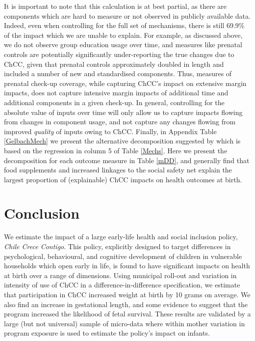 \documentclass[12pt]{article}
\begin{document}
\begin{spacing}{1.4}
It is important to note that this calculation is at best partial, as
there are components which are hard to measure or not observed in
publicly available data.  Indeed, even when controlling for the full
set of mechanisms, there is still 69.9\% of the impact which we are
unable to explain.  For example, as discussed above, we do not
observe group education usage over time, and measures like prenatal
controls are potentially significantly under-reporting the true changes
due to ChCC, given that prenatal controls approximately doubled in
length and included a number of new and standardised components.
Thus, measures of prenatal check-up coverage, while capturing ChCC's
impact on extensive margin impacts, does not capture intensive margin
impacts of additional time and additional components in a given check-up.
In general, controlling for the absolute value of inputs over time will
only allow us to capture impacts flowing from changes in component usage,
and not capture any changes flowing from improved \emph{quality} of
inputs owing to ChCC.
Finally, in Appendix Table \ref{GelbachMech} we present the alternative
decomposition suggested by \citet{Gelbach2016} which is based on the
regression in column 5 of Table \ref{Mechs}.  Here we present the
decomposition for each outcome measure in Table \ref{mDD}, and generally
find that food supplements and increased linkages to the social safety
net explain the largest proportion of (explainable) ChCC impacts on
health outcomes at birth.

\section{Conclusion}
We estimate the impact of a large early-life health and social inclusion
policy, \emph{Chile Crece Contigo}.  This policy, explicitly designed to
target differences in psychological, behavioural, and cognitive development
of children in vulnerable households which open early in life, is found to
have significant impacts on health at birth over a range of dimensions.
Using municipal roll-out and variation in intensity of use of ChCC in a
difference-in-difference specification, we estimate that participation in
ChCC increased weight at birth by 10 grams on average.  We also find an
increase in gestational length, and some evidence to suggest that the
program increased the likelihood of fetal survival.  These results are
validated by a large (but not universal) sample of micro-data where within
mother variation in program exposure is used to estimate the policy's impact
on infants.


\end{spacing}
\end{document}
